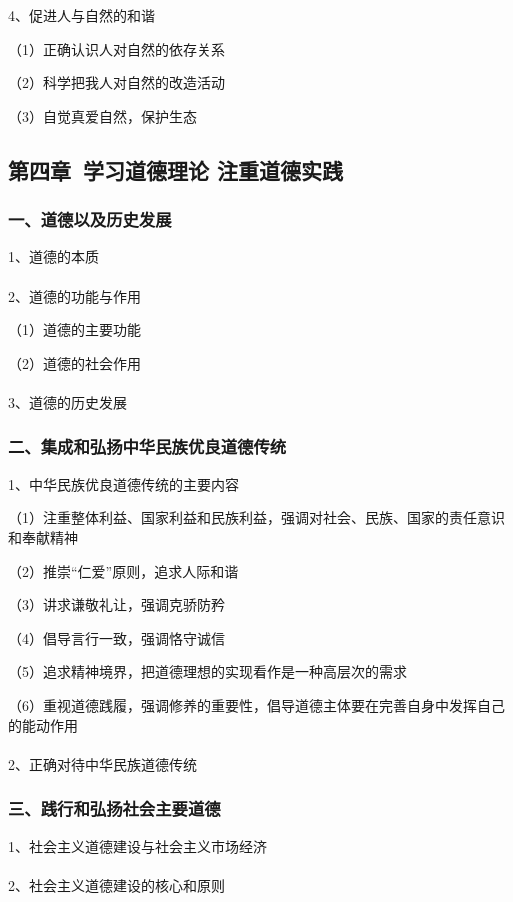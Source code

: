 \documentclass{ctexart}
\begin{document}
4、促进人与自然的和谐

（1）正确认识人对自然的依存关系

（2）科学把我人对自然的改造活动

（3）自觉真爱自然，保护生态


\subsection{第四章\ 学习道德理论 注重道德实践}

\subsubsection{一、道德以及历史发展}
1、道德的本质
\\\\

2、道德的功能与作用

（1）道德的主要功能

（2）道德的社会作用
\\\\

3、道德的历史发展

\subsubsection{二、集成和弘扬中华民族优良道德传统}
1、中华民族优良道德传统的主要内容

（1）注重整体利益、国家利益和民族利益，强调对社会、民族、国家的责任意识和奉献精神

（2）推崇“仁爱”原则，追求人际和谐

（3）讲求谦敬礼让，强调克骄防矜

（4）倡导言行一致，强调恪守诚信

（5）追求精神境界，把道德理想的实现看作是一种高层次的需求

（6）重视道德践履，强调修养的重要性，倡导道德主体要在完善自身中发挥自己的能动作用
\\\\

2、正确对待中华民族道德传统

\subsubsection{三、践行和弘扬社会主要道德}
1、社会主义道德建设与社会主义市场经济
\\\\

2、社会主义道德建设的核心和原则
\end{document}
